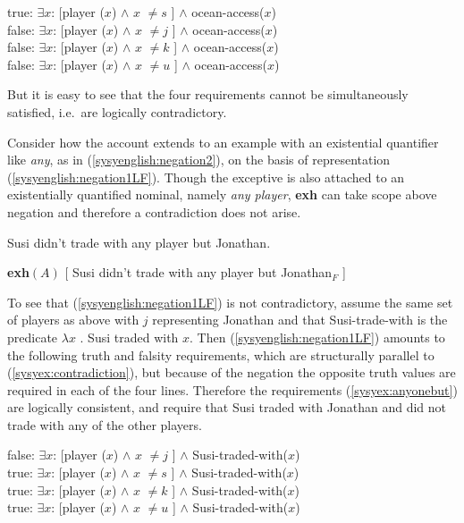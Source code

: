 \documentclass[output=paper,colorlinks,citecolor=brown,
]{langscibook}
\def\refp#1{(\ref{sy#1})}
\begin{document}
\ea \label{syex:contradiction}
    true: $\exists x$: [player ($x$) $\land$ $x$ $\neq s$ ] $\land$ ocean-access($x$)\\
    false: $\exists x$: [player ($x$) $\land$ $x$ $\neq j$ ] $\land$ ocean-access($x$)\\
	  false: $\exists x$: [player ($x$) $\land$ $x$ $\neq k$ ] $\land$ ocean-access($x$)\\
    false: $\exists x$: [player ($x$) $\land$ $x$ $\neq u$ ] $\land$ ocean-access($x$)\z

But it is easy to see that the four requirements cannot be simultaneously satisfied, i.e.\  are logically contradictory.

Consider how the account extends to an example with an existential quantifier like \emph{any}, as in \refp{syenglish:negation2},  on the basis of representation \refp{syenglish:negation1LF}.
Though the exceptive is also attached to an existentially quantified nominal, namely \emph{any player}, \textbf{exh} can take scope above negation and therefore a contradiction does not arise.

\ea \label{syenglish:negation2} 
Susi didn't trade with any player but Jonathan.\z

\ea \label{syenglish:negation1LF}
\textbf{exh}$(A)$ [ Susi didn't trade with any player but Jonathan$_F$ ]\z


To see that \refp{syenglish:negation1LF} is not contradictory, assume the same set of players as above with $j$ representing Jonathan and that Susi-trade-with is the predicate $\lambda x$ . Susi traded with $x$.  Then \refp{syenglish:negation1LF} amounts to the following truth and falsity requirements, which are structurally parallel to \refp{syex:contradiction}, but because of the negation the opposite truth values are required in each of the four lines.  Therefore the requirements \refp{syex:anyonebut} are logically consistent, and require that Susi traded with Jonathan and did not trade with any of the other players.

\ea \label{syex:anyonebut}
    false: $\exists x$: [player ($x$) $\land$ $x$ $\neq j$ ] $\land$ Susi-traded-with($x$)\\
    true: $\exists x$: [player ($x$) $\land$ $x$ $\neq s$ ] $\land$ Susi-traded-with($x$)\\
	  true: $\exists x$: [player ($x$) $\land$ $x$ $\neq k$ ] $\land$ Susi-traded-with($x$)\\
    true: $\exists x$: [player ($x$) $\land$ $x$ $\neq u$ ] $\land$ Susi-traded-with($x$)\z
\end{document}
